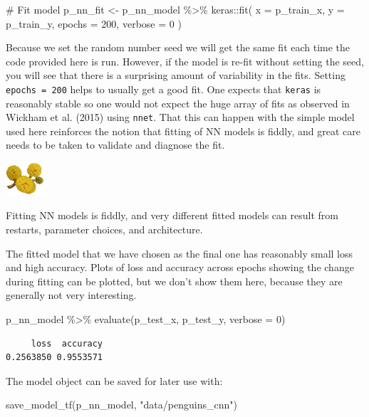 \documentclass[
  letterpaper,
]{krantz}
\newenvironment{Shaded}{\begin{snugshade}}{\end{snugshade}}
\newcommand{\AttributeTok}[1]{\textcolor[rgb]{0.40,0.45,0.13}{#1}}
\newcommand{\CommentTok}[1]{\textcolor[rgb]{0.37,0.37,0.37}{#1}}
\newcommand{\DecValTok}[1]{\textcolor[rgb]{0.68,0.00,0.00}{#1}}
\newcommand{\FunctionTok}[1]{\textcolor[rgb]{0.28,0.35,0.67}{#1}}
\newcommand{\NormalTok}[1]{\textcolor[rgb]{0.00,0.23,0.31}{#1}}
\newcommand{\OtherTok}[1]{\textcolor[rgb]{0.00,0.23,0.31}{#1}}
\newcommand{\SpecialCharTok}[1]{\textcolor[rgb]{0.37,0.37,0.37}{#1}}
\newcommand{\StringTok}[1]{\textcolor[rgb]{0.13,0.47,0.30}{#1}}
\newcommand{\infobox}[1]{%
\noindent\colorbox{info!30}{%
\begin{minipage}{0.98\linewidth}%
    \centering%
    \begin{minipage}[c]{0.15\linewidth} %
      \includegraphics[width=1.5cm]{images/mulga-flowers2.png} %
    \end{minipage}%
    \hfill %
    \begin{minipage}[c]{0.8\linewidth} %
      \bigskip%
      \textsf{#1}%
      \bigskip%
    \end{minipage}%
    \hspace*{3mm}%
  \end{minipage}%
}%
}
\begin{document}
\begin{Shaded}
\begin{Highlighting}[]
\CommentTok{\# Fit model}
\NormalTok{p\_nn\_fit }\OtherTok{\textless{}{-}}\NormalTok{ p\_nn\_model }\SpecialCharTok{\%\textgreater{}\%}\NormalTok{ keras}\SpecialCharTok{::}\FunctionTok{fit}\NormalTok{(}
  \AttributeTok{x =}\NormalTok{ p\_train\_x, }
  \AttributeTok{y =}\NormalTok{ p\_train\_y,}
  \AttributeTok{epochs =} \DecValTok{200}\NormalTok{,}
  \AttributeTok{verbose =} \DecValTok{0}
\NormalTok{)}
\end{Highlighting}
\end{Shaded}

Because we set the random number seed we will get the same fit each time
the code provided here is run. However, if the model is re-fit without
setting the seed, you will see that there is a surprising amount of
variability in the fits. Setting \texttt{epochs\ =\ 200} helps to
usually get a good fit. One expects that \texttt{keras} is reasonably
stable so one would not expect the huge array of fits as observed in
Wickham et al. (2015) using \texttt{nnet}. That this can happen with the
simple model used here reinforces the notion that fitting of NN models
is fiddly, and great care needs to be taken to validate and diagnose the
fit.

\infobox{Fitting NN models is fiddly, and very different fitted models can result from restarts, parameter choices, and architecture.  
}

The fitted model that we have chosen as the final one has reasonably
small loss and high accuracy. Plots of loss and accuracy across epochs
showing the change during fitting can be plotted, but we don't show them
here, because they are generally not very interesting.

\begin{Shaded}
\begin{Highlighting}[]
\NormalTok{p\_nn\_model }\SpecialCharTok{\%\textgreater{}\%} \FunctionTok{evaluate}\NormalTok{(p\_test\_x, p\_test\_y, }\AttributeTok{verbose =} \DecValTok{0}\NormalTok{)}
\end{Highlighting}
\end{Shaded}

\begin{verbatim}
     loss  accuracy 
0.2563850 0.9553571 
\end{verbatim}

The model object can be saved for later use with:

\begin{Shaded}
\begin{Highlighting}[]
\FunctionTok{save\_model\_tf}\NormalTok{(p\_nn\_model, }\StringTok{"data/penguins\_cnn"}\NormalTok{)}
\end{Highlighting}
\end{Shaded}
\end{document}
